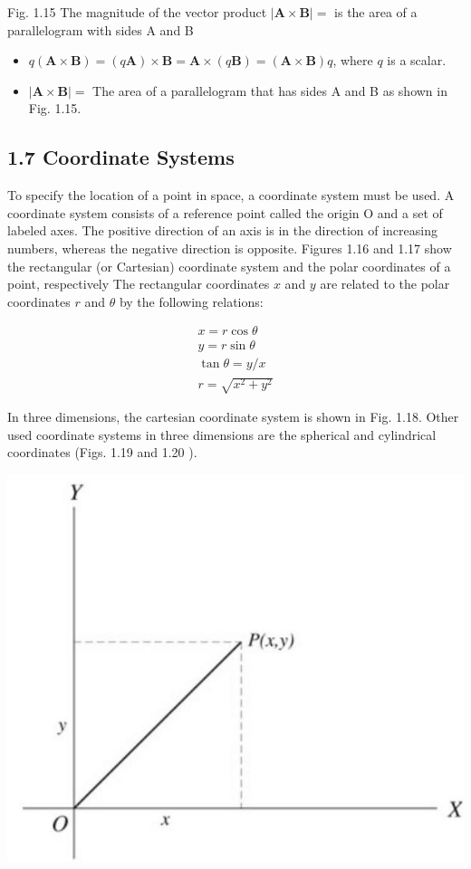 \documentclass[10pt]{article}
\begin{document}
Fig. 1.15 The magnitude of the vector product $|\mathbf{A} \times \mathbf{B}|=$ is the area of a parallelogram with sides A and B

\begin{itemize}
  \item $q(\mathbf{A} \times \mathbf{B})=(q \mathbf{A}) \times \mathbf{B}=\mathbf{A} \times(q \mathbf{B})=(\mathbf{A} \times \mathbf{B}) q$, where $q$ is a scalar.
  \item $|\mathbf{A} \times \mathbf{B}|=$ The area of a parallelogram that has sides A and B as shown in Fig. 1.15.
\end{itemize}

\subsection*{1.7 Coordinate Systems}
To specify the location of a point in space, a coordinate system must be used. A coordinate system consists of a reference point called the origin O and a set of labeled axes. The positive direction of an axis is in the direction of increasing numbers, whereas the negative direction is opposite. Figures 1.16 and 1.17 show the rectangular (or Cartesian) coordinate system and the polar coordinates of a point, respectively The rectangular coordinates $x$ and $y$ are related to the polar coordinates $r$ and $\theta$ by the following relations:

$$
\begin{gathered}
x=r \cos \theta \\
y=r \sin \theta \\
\tan \theta=y / x \\
r=\sqrt{x^{2}+y^{2}}
\end{gathered}
$$

In three dimensions, the cartesian coordinate system is shown in Fig. 1.18. Other used coordinate systems in three dimensions are the spherical and cylindrical coordinates (Figs. 1.19 and 1.20 ).

\begin{center}
\includegraphics[max width=\textwidth]{2024_09_13_db1f357d2aad0a03eb2eg-017(3)}
\end{center}
\end{document}
